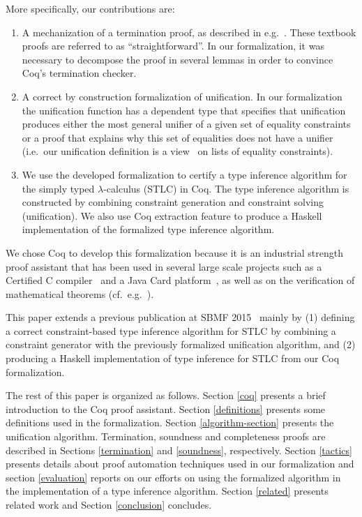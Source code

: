 More specifically, our contributions are:
\begin{enumerate}

  \item A mechanization of a termination proof, as described in
    e.g.~. These textbook proofs are
    referred to as ``straightforward''. In our formalization, it was
    necessary to decompose the proof in several lemmas in order to
    convince Coq's termination checker.

  \item A correct by construction formalization of unification. In our
    formalization the unification function has a dependent type that
    specifies that unification produces either the most general
    unifier of a given set of equality constraints or a proof that
    explains why this set of equalities does not have a unifier
    (i.e.~our unification definition is a view~ on
    lists of equality constraints).

  \item We use the developed formalization to certify a type inference
    algorithm for the simply typed $\lambda$-calculus (STLC) in Coq.
    The type inference algorithm is constructed by combining
    constraint generation and constraint solving (unification). We
    also use Coq extraction feature to produce a Haskell
    implementation of the formalized type inference algorithm.

\end{enumerate}

We chose Coq to develop this formalization because it is an industrial
strength proof assistant that has been used in several large scale
projects such as a Certified C compiler~ and a Java
Card platform~, as well as on the verification of
mathematical theorems (cf.~e.g.~).

This paper extends a previous publication at SBMF 2015~\cite{RibeiroC15} mainly
by (1) defining a correct constraint-based type inference algorithm for STLC by
combining a constraint generator with the previously formalized unification
algorithm, and (2) producing a Haskell implementation of type inference for
STLC from our Coq formalization.

The rest of this paper is organized as follows. Section \ref{coq}
presents a brief introduction to the Coq proof assistant.  Section
\ref{definitions} presents some definitions used in the
formalization. Section \ref{algorithm-section} presents the
unification algorithm. Termination, soundness and completeness proofs
are described in Sections \ref{termination} and \ref{soundness},
respectively. Section \ref{tactics} presents details about proof
automation techniques used in our formalization and section
\ref{evaluation} reports on our efforts on using the formalized
algorithm in the implementation of a type inference algorithm.
Section \ref{related} presents related work and Section
\ref{conclusion} concludes.

